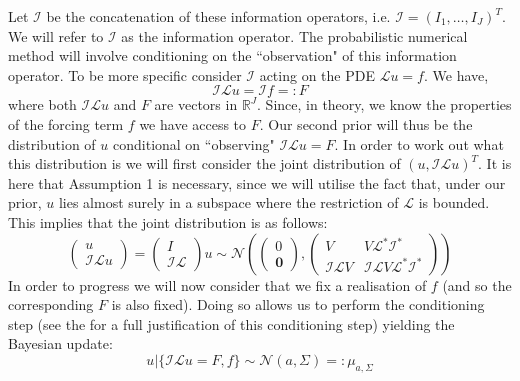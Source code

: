 Let $\mathcal{I}$ be the concatenation of these information operators, i.e. $\mathcal{I}=(I_1,\dots,I_J)^{T}$. We will refer to $\mathcal{I}$ as the information operator. The probabilistic numerical method will involve conditioning on the ``observation" of this information operator. To be more specific consider $\mathcal{I}$ acting on the PDE $\mathcal{L}u=f$. We have,
\begin{equation*}
    \mathcal{I}\mathcal{L}u=\mathcal{I}f=:F
\end{equation*}
where both $\mathcal{I}\mathcal{L}u$ and $F$ are vectors in $\mathbb{R}^{J}$. Since, in theory, we know the properties of the forcing term $f$ we have access to $F$. Our second prior will thus be the distribution of $u$ conditional on ``observing" $\mathcal{I}\mathcal{L}u=F$. In order to work out what this distribution is we will first consider the joint distribution of $(u,\mathcal{I}\mathcal{L}u)^{T}$. It is here that Assumption 1 is necessary, since we will utilise the fact that, under our prior, $u$ lies almost surely in a subspace where the restriction of $\mathcal{L}$ is bounded. This implies that the joint distribution is as follows:
\begin{equation}
    \label{jointInfoDist}
    \begin{pmatrix}
    u \\
    \mathcal{I}\mathcal{L}u
    \end{pmatrix} =
    \begin{pmatrix}
    I \\ \mathcal{I}\mathcal{L}
    \end{pmatrix} u \sim \mathcal{N}\left(
    \begin{pmatrix}
    0 \\
    \mathbf{0}
    \end{pmatrix},
    \begin{pmatrix}
    V & V\mathcal{L}^{*}\mathcal{I}^{*} \\
    \mathcal{I}\mathcal{L}V & \mathcal{I}\mathcal{L}V\mathcal{L}^{*}\mathcal{I}^{*}
    \end{pmatrix}
    \right)
\end{equation}
In order to progress we will now consider that we fix a realisation of $f$ (and so the corresponding $F$ is also fixed). Doing so allows us to perform the conditioning step (see the \textcolor{blue}{} for a full justification of this conditioning step) yielding the Bayesian update:
\begin{equation}
    \label{conditionalDistnFixed_f}
    u|\{\mathcal{I}\mathcal{L}u=F,f\}\sim\mathcal{N}(a,\Sigma)=:\mu_{a,\Sigma}
\end{equation}
